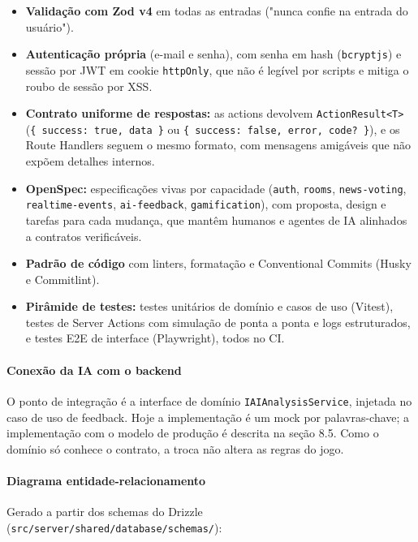 \documentclass[
  brazilian,
  11pt,
]{article}
\providecommand{\tightlist}{%
  \setlength{\itemsep}{0pt}\setlength{\parskip}{0pt}}
\begin{document}
\begin{itemize}
\tightlist
\item
  \textbf{Validação com Zod v4} em todas as entradas ("nunca confie na entrada do usuário").
\item
  \textbf{Autenticação própria} (e-mail e senha), com senha em hash (\texttt{bcryptjs}) e sessão por JWT em cookie \texttt{httpOnly}, que não é legível por scripts e mitiga o roubo de sessão por XSS.
\item
  \textbf{Contrato uniforme de respostas:} as actions devolvem \texttt{ActionResult\textless{}T\textgreater{}} (\texttt{\{\ success:\ true,\ data\ \}} ou \texttt{\{\ success:\ false,\ error,\ code?\ \}}), e os Route Handlers seguem o mesmo formato, com mensagens amigáveis que não expõem detalhes internos.
\item
  \textbf{OpenSpec:} especificações vivas por capacidade (\texttt{auth}, \texttt{rooms}, \texttt{news-voting}, \texttt{realtime-events}, \texttt{ai-feedback}, \texttt{gamification}), com proposta, design e tarefas para cada mudança, que mantêm humanos e agentes de IA alinhados a contratos verificáveis.
\item
  \textbf{Padrão de código} com linters, formatação e Conventional Commits (Husky e Commitlint).
\item
  \textbf{Pirâmide de testes:} testes unitários de domínio e casos de uso (Vitest), testes de Server Actions com simulação de ponta a ponta e logs estruturados, e testes E2E de interface (Playwright), todos no CI.
\end{itemize}

\paragraph{Conexão da IA com o backend}\label{conexuxe3o-da-ia-com-o-backend}

O ponto de integração é a interface de domínio \texttt{IAIAnalysisService}, injetada no caso de uso de feedback. Hoje a implementação é um mock por palavras-chave; a implementação com o modelo de produção é descrita na seção 8.5. Como o domínio só conhece o contrato, a troca não altera as regras do jogo.

\paragraph{Diagrama entidade-relacionamento}\label{diagrama-entidade-relacionamento}

Gerado a partir dos schemas do Drizzle (\texttt{src/server/shared/\allowbreak database/\allowbreak schemas/}):
\end{document}
